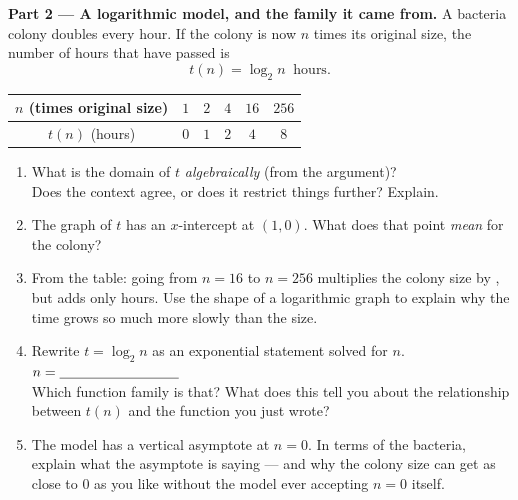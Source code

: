 \documentclass[10pt]{article}
\begin{document}
\begin{tcolorbox}[colback=white, colframe=black!40, title=\textbf{Tier E --- Extension},
    fonttitle=\bfseries, arc=1.5mm, left=3mm, right=3mm, top=2mm, bottom=2mm, breakable]
\vspace{5pt}
\textbf{Part 2 --- A logarithmic model, and the family it came from.} A bacteria colony doubles every
hour. If the colony is now $n$ times its original size, the number of hours that have passed is
\[
  t(n) = \log_2 n \ \text{ hours.}
\]
\begin{center}
\renewcommand{\arraystretch}{1.25}
\begin{tabular}{|c|c|c|c|c|c|}
\hline
$n$ (times original size) & $1$ & $2$ & $4$ & $16$ & $256$ \\ \hline
$t(n)$ (hours) & $0$ & $1$ & $2$ & $4$ & $8$ \\ \hline
\end{tabular}
\end{center}
\begin{enumerate}[label=(\alph*), leftmargin=1.9em, itemsep=6pt]
  \item What is the domain of $t$ \emph{algebraically} (from the argument)? \blank{3.0cm} \\
        Does the context agree, or does it restrict things further? Explain. 
  \item The graph of $t$ has an $x$-intercept at $(1,0)$. What does that point \emph{mean} for the
        colony? 
  \item From the table: going from $n=16$ to $n=256$ multiplies the colony size by \blank{1.2cm},
        but adds only \blank{1.2cm} hours. Use the shape of a logarithmic graph to explain why the
        time grows so much more slowly than the size. 
  \item Rewrite $t=\log_2 n$ as an exponential statement solved for $n$. \quad $n=\blank{3.0cm}$ \\
        Which function family is that? \blank{2.6cm} \quad What does this tell you about the
        relationship between $t(n)$ and the function you just wrote? 
  \item The model has a vertical asymptote at $n=0$. In terms of the bacteria, explain what the
        asymptote is saying --- and why the colony size can get as close to $0$ as you like without
        the model ever accepting $n=0$ itself. 
\end{enumerate}
\end{tcolorbox}
\end{document}
